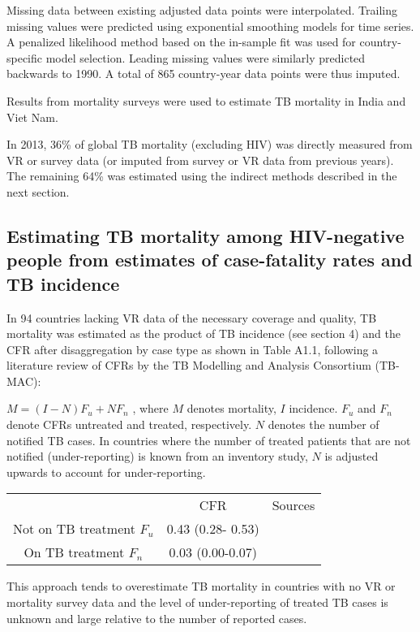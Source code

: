 Missing data between existing adjusted data points were interpolated. Trailing missing values were predicted using exponential smoothing models for time series. A penalized likelihood method based on the in-sample fit was used for country-specific model selection. Leading missing values were similarly predicted backwards to 1990. A total of 865 country-year data points were thus imputed.

Results from mortality surveys were used to estimate TB mortality in India and Viet Nam. 

In 2013, 36\% of global TB mortality (excluding HIV) was directly measured from VR or survey data (or imputed from survey or VR data from previous years). The remaining 64\% was estimated using the indirect methods described in the next section.


\subsection{Estimating TB mortality among HIV-negative people from estimates of case-fatality rates and TB incidence
}

In 94 countries lacking VR data of the necessary coverage and quality, TB mortality was estimated as the product of TB incidence (see section 4) and the CFR after disaggregation by case type as shown in Table A1.1, following a literature review of CFRs by the TB Modelling and Analysis Consortium (TB-MAC):

$M = (I-N)F_u + NF_n$ , where $M$ denotes mortality, $I$ incidence. $F_u$ and $F_n$ denote CFRs untreated and treated, respectively. $N$ denotes the number of notified TB cases. In countries where the number of treated patients that are not notified (under-reporting) is known from an inventory study, $N$ is adjusted upwards to account for under-reporting. 

\begin{table} 
    \begin{tabular}{ c c c }
         & CFR & Sources \\ 
        Not on TB treatment $F_u$ & 0.43 (0.28- 0.53) &  \cite{12742798} \cite{21483732} \\ 
        On TB treatment $F_n$ & 0.03 (0.00-0.07) &  \cite{21738585} \\ 
    \end{tabular} 
\end{table}

This approach tends to overestimate TB mortality in countries with no VR or mortality survey data and the level of under-reporting of treated TB cases is unknown and large relative to the number of reported cases. 


